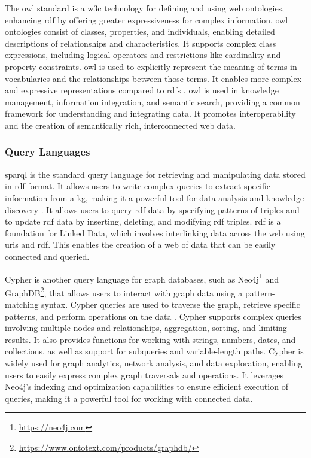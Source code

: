 The \gls{owl} standard is a \gls{w3c} technology for defining and using web ontologies, enhancing \gls{rdf} by offering greater expressiveness for complex information. \gls{owl} ontologies consist of classes, properties, and individuals, enabling detailed descriptions of relationships and characteristics. It supports complex class expressions, including logical operators and restrictions like cardinality and property constraints.
\gls{owl} is used to explicitly represent the meaning of terms in vocabularies and the relationships between those terms. It enables more complex and expressive representations compared to \gls{rdfs} \cite{Deborah2004}.
\gls{owl} is used in knowledge management, information integration, and semantic search, providing a common framework for understanding and integrating data. It promotes interoperability and the creation of semantically rich, interconnected web data.

\subsubsection*{Query Languages}
\gls{sparql} is the standard query language for retrieving and manipulating data stored in \gls{rdf} format. It allows users to write complex queries to extract specific information from a \gls{kg}, making it a powerful tool for data analysis and knowledge discovery \cite{Jorge2009}.
It allows users to query \gls{rdf} data by specifying patterns of triples and to update \gls{rdf} data by inserting, deleting, and modifying \gls{rdf} triples. \gls{rdf} is a foundation for Linked Data, which involves interlinking data across the web using \glspl{uri} and \gls{rdf}. This enables the creation of a web of data that can be easily connected and queried.

Cypher is another query language for graph databases, such as Neo4j\footnote{\url{https://neo4j.com}} and GraphDB\footnote{\url{https://www.ontotext.com/products/graphdb/}}, that allows users to interact with graph data using a pattern-matching syntax. Cypher queries are used to traverse the graph, retrieve specific patterns, and perform operations on the data \cite{Francis2018}.
Cypher supports complex queries involving multiple nodes and relationships, aggregation, sorting, and limiting results. It also provides functions for working with strings, numbers, dates, and collections, as well as support for subqueries and variable-length paths.
Cypher is widely used for graph analytics, network analysis, and data exploration, enabling users to easily express complex graph traversals and operations. It leverages Neo4j's indexing and optimization capabilities to ensure efficient execution of queries, making it a powerful tool for working with connected data.

